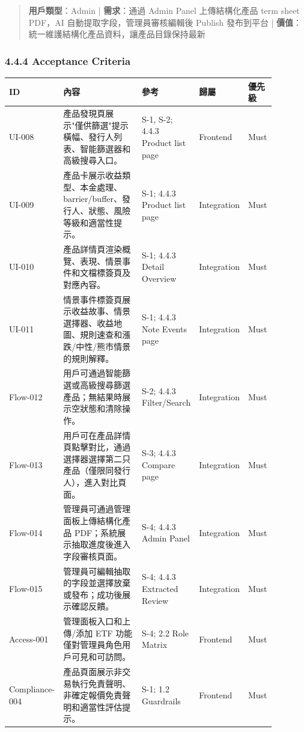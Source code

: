 \begin{quote}\small \textbf{用戶類型}：Admin | \textbf{需求}：通過 Admin Panel 上傳結構化產品 term sheet PDF，AI 自動提取字段，管理員審核編輯後 Publish 發布到平台 | \textbf{價值}：統一維護結構化產品資料，讓產品目錄保持最新\end{quote}


\subsubsection{4.4.4 Acceptance Criteria}

\begingroup
\small
\begin{longtable}{L{0.18\linewidth}L{0.30\linewidth}L{0.18\linewidth}L{0.12\linewidth}L{0.10\linewidth}}
\toprule
\textbf{ID} & \textbf{內容} & \textbf{參考} & \textbf{歸屬} & \textbf{優先級} \\
\midrule
UI-008 & 產品發現頁展示"僅供篩選"提示橫幅、發行人列表、智能篩選器和高級搜尋入口。 & S-1, S-2; 4.4.3 Product list page & Frontend & Must \\
UI-009 & 產品卡展示收益類型、本金處理、 barrier/buffer、發行人、狀態、風險等級和適當性提示。 & S-1; 4.4.3 Product list page & Integration & Must \\
UI-010 & 產品詳情頁渲染概覽、表現、情景事件和文檔標簽頁及對應內容。 & S-1; 4.4.3 Detail Overview & Integration & Must \\
UI-011 & 情景事件標簽頁展示收益故事、情景選擇器、收益地圖、規則速查和漲跌/中性/熊市情景的規則解釋。 & S-1; 4.4.3 Note Events page & Integration & Must \\
Flow-012 & 用戶可通過智能篩選或高級搜尋篩選產品；無結果時展示空狀態和清除操作。 & S-2; 4.4.3 Filter/Search & Integration & Must \\
Flow-013 & 用戶可在產品詳情頁點擊對比，通過選擇器選擇第二只產品（僅限同發行人），進入對比頁面。 & S-3; 4.4.3 Compare page & Integration & Must \\
Flow-014 & 管理員可通過管理面板上傳結構化產品 PDF；系統展示抽取進度後進入字段審核頁面。 & S-4; 4.4.3 Admin Panel & Integration & Must \\
Flow-015 & 管理員可編輯抽取的字段並選擇放棄或發布；成功後展示確認反饋。 & S-4; 4.4.3 Extracted Review & Integration & Must \\
Access-001 & 管理面板入口和上傳/添加 ETF 功能僅對管理員角色用戶可見和可訪問。 & S-4; 2.2 Role Matrix & Frontend & Must \\
Compliance-004 & 產品頁面展示非交易執行免責聲明、非確定報價免責聲明和適當性評估提示。 & S-1; 1.2 Guardrails & Frontend & Must \\
\bottomrule
\end{longtable}
\endgroup

